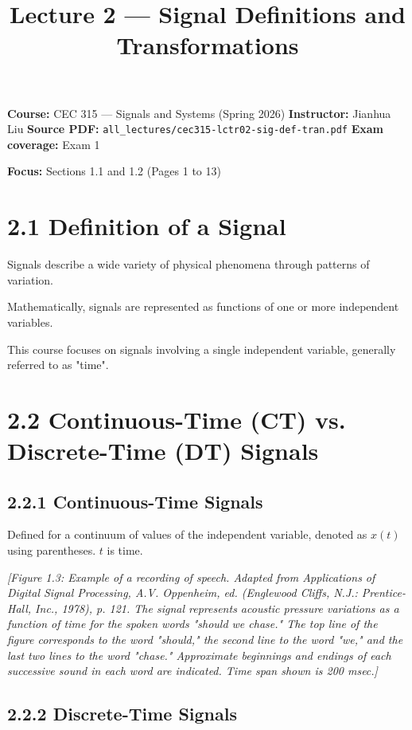 \documentclass[11pt]{article}
\title{Lecture 2 — Signal Definitions and Transformations}
\author{}
\date{}
\begin{document}
\maketitle

\textbf{Course:} CEC 315 — Signals and Systems (Spring 2026)
\textbf{Instructor:} Jianhua Liu
\textbf{Source PDF:} \texttt{all\_lectures/cec315-lctr02-sig-def-tran.pdf}
\textbf{Exam coverage:} Exam 1

\textbf{Focus:} Sections 1.1 and 1.2 (Pages 1 to 13)

\section*{2.1 Definition of a Signal}

Signals describe a wide variety of physical phenomena through patterns of variation.

Mathematically, signals are represented as functions of one or more independent variables.

This course focuses on signals involving a single independent variable, generally referred to as "time".

\section*{2.2 Continuous-Time (CT) vs. Discrete-Time (DT) Signals}

\subsection*{2.2.1 Continuous-Time Signals}

Defined for a continuum of values of the independent variable, denoted as $x(t)$ using parentheses. $t$ is time.

\textit{[Figure 1.3: Example of a recording of speech. Adapted from Applications of Digital Signal Processing, A.V. Oppenheim, ed. (Englewood Cliffs, N.J.: Prentice-Hall, Inc., 1978), p. 121. The signal represents acoustic pressure variations as a function of time for the spoken words "should we chase." The top line of the figure corresponds to the word "should," the second line to the word "we," and the last two lines to the word "chase." Approximate beginnings and endings of each successive sound in each word are indicated. Time span shown is 200 msec.]}

\subsection*{2.2.2 Discrete-Time Signals}
\end{document}
